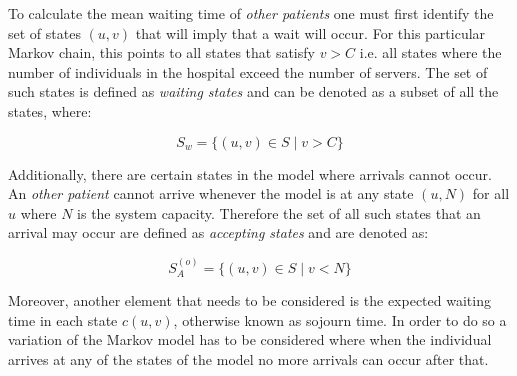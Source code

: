 To calculate the mean waiting time of \textit{other patients} one must first identify 
the set of states \((u, v)\) that will imply that a wait will occur. 
For this particular Markov chain, this points to all states that satisfy \(v > C\) 
i.e. all states where the number of individuals in the hospital exceed the number 
of servers. 
The set of such states is defined as \textit{waiting states} and can be denoted 
as a subset of all the states, where:

\begin{equation} \label{eq:waiting_states}
    S_w = \{(u, v) \in S \; | \; v > C \}    
\end{equation}

Additionally, there are certain states in the model where arrivals cannot occur. 
An \textit{other patient} cannot arrive whenever the model is at any state \((u, N)\) 
for all \(u\) where \(N\) is the system capacity. 
Therefore the set of all such states that an arrival may occur are defined as 
\textit{accepting states} and are denoted as:

\begin{equation}\label{eq:accepting_states_others}
    S_A^{(o)} = \{(u, v) \in S \; | \; v < N \}
\end{equation}



Moreover, another element that needs to be considered is the expected waiting time 
in each state \( c(u,v) \), otherwise known as sojourn time. 
In order to do so a variation of the Markov model has to be considered where when 
the individual arrives at any of the states of the model no more arrivals can 
occur after that. 


